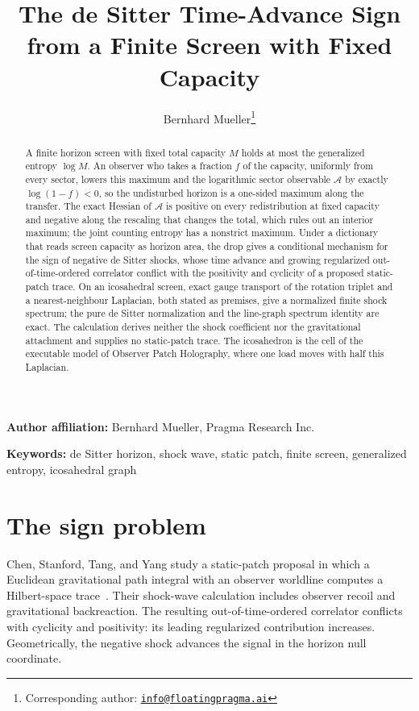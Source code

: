 \documentclass[11pt]{article}
\title{\textbf{The de Sitter Time-Advance Sign\\
from a Finite Screen with Fixed Capacity}}
\author{Bernhard Mueller\thanks{Corresponding author:
\href{mailto:info@floatingpragma.ai}{\texttt{info@floatingpragma.ai}}}}
\date{\OPHPaperReleaseDate}
\theoremstyle{remark}
\begin{document}
\maketitle
\OPHPaperReleaseBanner

\begin{center}
\small\textbf{Author affiliation:} Bernhard Mueller, Pragma Research Inc.
\end{center}

\begin{abstract}
A finite horizon screen with fixed total capacity \(M\) holds at most the
generalized entropy \(\log M\). An observer who takes a fraction \(f\) of the
capacity, uniformly from every sector, lowers this maximum and the
logarithmic sector observable \(\mathcal A\) by exactly \(\log(1-f)<0\), so
the undisturbed horizon is a one-sided maximum along the transfer. The exact
Hessian of \(\mathcal A\) is positive on every redistribution at fixed
capacity and negative along the rescaling that changes the total, which rules
out an interior maximum; the joint counting entropy has a nonstrict maximum.
Under a dictionary that reads screen capacity as horizon
area, the drop gives a conditional mechanism for the sign of negative de
Sitter shocks, whose time advance and growing regularized
out-of-time-ordered correlator conflict with the positivity and cyclicity of
a proposed static-patch trace. On an icosahedral screen, exact gauge
transport of the rotation triplet and a nearest-neighbour Laplacian, both
stated as premises, give a normalized finite shock spectrum; the pure de
Sitter normalization and the line-graph spectrum identity are exact. The
calculation derives neither the shock coefficient nor the gravitational
attachment and supplies no static-patch trace. The icosahedron is the cell of
the executable model of Observer Patch Holography, where one load moves with
half this Laplacian.
\end{abstract}

\noindent\textbf{Keywords:} de Sitter horizon, shock wave, static patch,
finite screen, generalized entropy, icosahedral graph


\section{The sign problem}

Chen, Stanford, Tang, and Yang study a static-patch proposal in which a
Euclidean gravitational path integral with an observer worldline computes a
Hilbert-space trace~\cite{chenStanfordTangYang2026}. Their shock-wave
calculation includes observer recoil and gravitational backreaction. The
resulting out-of-time-ordered correlator conflicts with cyclicity and
positivity: its leading regularized contribution increases. Geometrically,
the negative shock advances the signal in the horizon null coordinate.
\end{document}
